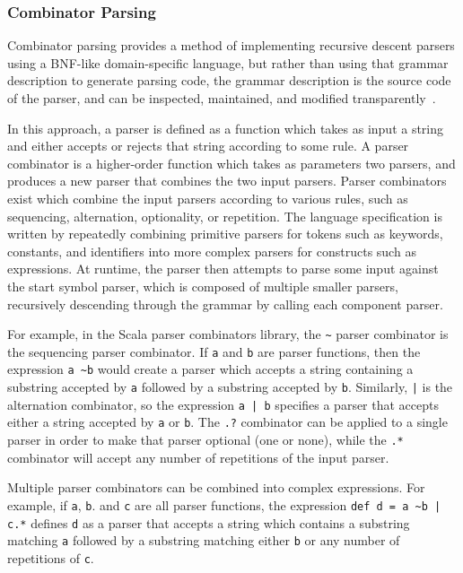 \subsubsection{Combinator Parsing}
Combinator parsing provides a method of implementing recursive descent parsers using a BNF-like domain-specific language,  but rather than using that grammar description to generate parsing code, the grammar description is the source code of the parser, and can be inspected, maintained, and modified transparently~\cite{ghosh2010dsls,hofer2008polymorphic,moors2008parser}.

In this approach, a parser is defined as a function which takes as input a string and either accepts or rejects that string according to some rule. A parser combinator is a higher-order function which takes as parameters two parsers, and produces a new parser that combines the two input parsers. Parser combinators exist which combine the input parsers according to various rules, such as sequencing, alternation, optionality, or repetition. The language specification is written by repeatedly combining primitive parsers for tokens such as keywords, constants, and identifiers into more complex parsers for constructs such as expressions. At runtime, the parser then attempts to parse some input against the start symbol parser, which is composed of multiple smaller parsers, recursively descending through the grammar by calling each component parser.~\cite{moors2008parser,swierstra2001combinator,fokker1995functional,frost2008parser}

For example, in the Scala parser combinators library, the \texttt{\textasciitilde} parser combinator is the sequencing parser combinator. If \texttt{a} and \texttt{b} are parser functions, then the expression \texttt{a \textasciitilde b} would create a parser which accepts a string containing a substring accepted by \texttt{a} followed by a substring accepted by \texttt{b}. Similarly,  \texttt{|} is the alternation combinator, so the expression \texttt{a | b} specifies a parser that accepts either a string accepted by \texttt{a} or \texttt{b}.  The \texttt{.?} combinator can be applied to a single parser in order to make that parser optional (one or none), while the \texttt{.*} combinator will accept any number of repetitions of the input parser. 

Multiple parser combinators can be combined into complex expressions. For example, if \texttt{a}, \texttt{b}. and \texttt{c} are all parser functions, the expression \texttt{def d = a \textasciitilde b | c.*} defines \texttt{d} as a parser that accepts a string which contains a substring matching \texttt{a} followed by a substring matching either \texttt{b} or any number of repetitions of \texttt{c}.

